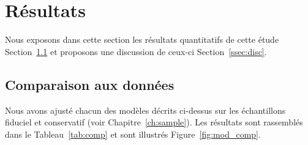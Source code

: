 \documentclass[../main/main.tex]{subfiles}
\begin{document}
\section{Résultats}\label{sec:xres}

Nous exposons dans cette section les résultats quantitatifs de cette étude
Section~\ref{ssec:xcomp} et proposons une discussion de ceux-ci
Section~\ref{ssec:disc}.

\subsection{Comparaison aux données}\label{ssec:xcomp}
Nous avons ajusté chacun des modèles décrits ci-dessus sur les échantillons
fiduciel et conservatif (voir Chapitre~\ref{ch:sample}). Les résultats sont
rassemblés dans le Tableau~\ref{tab:comp} et sont illustrés
Figure~\ref{fig:mod_comp}.
\end{document}
